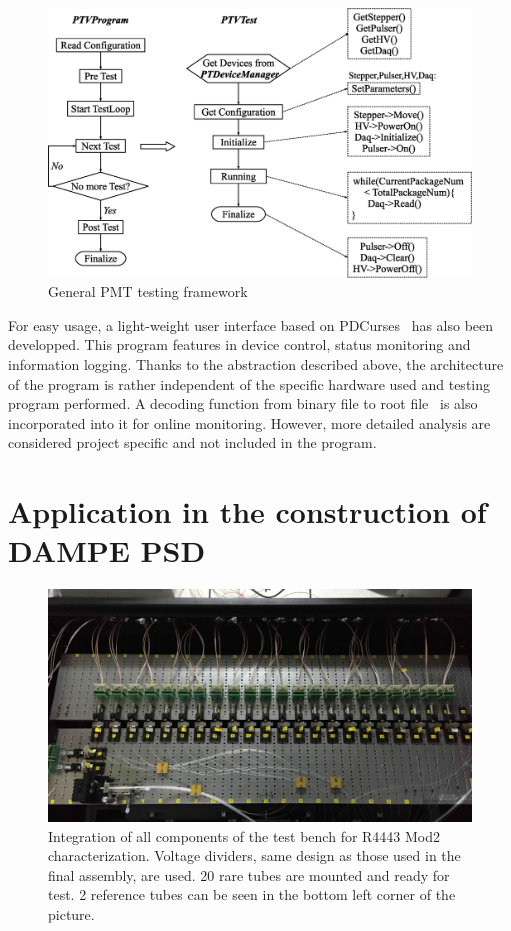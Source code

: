 \documentclass[review, times]{elsarticle}
\begin{document}
\begin{figure}
  \centering
 \includegraphics[width=140mm]{software_framework}
\caption{General PMT testing framework}
\label{fig:software_framework}
\end{figure}

For easy usage, a light-weight user interface based on PDCurses~\cite{pdcurses} has also been developped.
This program features in device control, status monitoring and information logging.
Thanks to the abstraction described above, the architecture of the program is rather independent of the specific hardware used and testing program performed.
A decoding function from binary file to root file~\cite{root} is also incorporated into it for online monitoring.
However, more detailed analysis are considered project specific and not included in the program. 

\section{Application in the construction of DAMPE PSD}
\label{sec:application}

\begin{figure}
 \centering
 \includegraphics[width=140mm]{integration3}
\caption{Integration of all components of the test bench for R4443 Mod2 characterization.
Voltage dividers, same design as those used in the final assembly, are used. 
20 rare tubes are mounted and ready for test.
2 reference tubes can be seen in the bottom left corner of the picture. 
}
\label{fig:integrated_testbench}
\end{figure}
\end{document}
